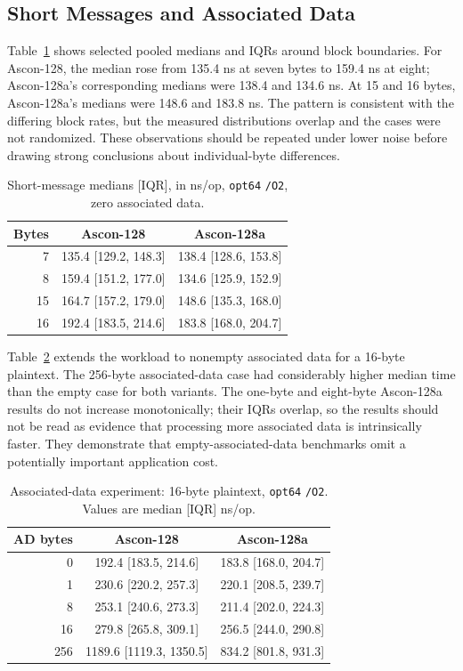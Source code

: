 \documentclass[conference]{IEEEtran}
\begin{document}
\subsection{Short Messages and Associated Data}
Table~\ref{tab:boundary} shows selected pooled medians and IQRs around block
boundaries. For Ascon-128, the median rose from 135.4 ns at seven bytes to
159.4 ns at eight; Ascon-128a's corresponding medians were 138.4 and 134.6 ns.
At 15 and 16 bytes, Ascon-128a's medians were 148.6 and 183.8 ns. The
pattern is consistent with the differing block rates, but the measured
distributions overlap and the cases were not randomized. These observations
should be repeated under lower noise before drawing strong conclusions about
individual-byte differences.

\begin{table}[htbp]
\caption{Short-message medians [IQR], in ns/op, \texttt{opt64} \texttt{/O2},
zero associated data.}
\label{tab:boundary}
\centering
\begin{tabular}{rcc}
\hline
Bytes & Ascon-128 & Ascon-128a \\
\hline
7  & 135.4 [129.2, 148.3] & 138.4 [128.6, 153.8] \\
8  & 159.4 [151.2, 177.0] & 134.6 [125.9, 152.9] \\
15 & 164.7 [157.2, 179.0] & 148.6 [135.3, 168.0] \\
16 & 192.4 [183.5, 214.6] & 183.8 [168.0, 204.7] \\
\hline
\end{tabular}
\end{table}

Table~\ref{tab:ad} extends the workload to nonempty associated data for a
16-byte plaintext. The 256-byte associated-data case had considerably higher
median time than the empty case for both variants. The one-byte and eight-byte
Ascon-128a results do not increase monotonically; their IQRs overlap, so the
results should not be read as evidence that processing more associated data
is intrinsically faster. They demonstrate that empty-associated-data
benchmarks omit a potentially important application cost.

\begin{table}[htbp]
\caption{Associated-data experiment: 16-byte plaintext, \texttt{opt64}
\texttt{/O2}. Values are median [IQR] ns/op.}
\label{tab:ad}
\centering
\begin{tabular}{rcc}
\hline
AD bytes & Ascon-128 & Ascon-128a \\
\hline
0   & 192.4 [183.5, 214.6] & 183.8 [168.0, 204.7] \\
1   & 230.6 [220.2, 257.3] & 220.1 [208.5, 239.7] \\
8   & 253.1 [240.6, 273.3] & 211.4 [202.0, 224.3] \\
16  & 279.8 [265.8, 309.1] & 256.5 [244.0, 290.8] \\
256 & 1189.6 [1119.3, 1350.5] & 834.2 [801.8, 931.3] \\
\hline
\end{tabular}
\end{table}
\end{document}

